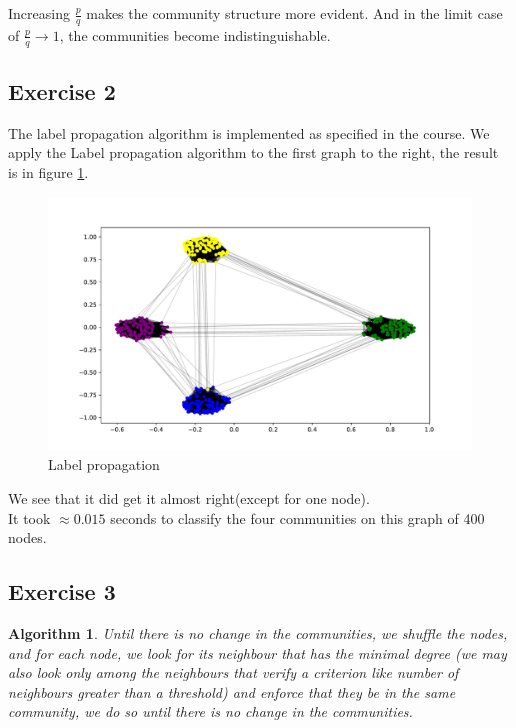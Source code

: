 \documentclass{article}
\newtheorem{algorithm}{Algorithm}
\begin{document}
Increasing $ \frac{p}{q} $ makes the community structure more evident.
And in the limit case of $ \frac{p}{q} \to 1 $, the communities become
indistinguishable.

\subsection*{Exercise 2}
The label propagation algorithm is implemented as specified in the course.
We apply the Label propagation algorithm to the first graph to the right, the
result is in figure \ref{fig:LP}.

\begin{figure}[!ht]
    \centering
    \includegraphics[width=\linewidth]{plots/images1/LabelPropagation.pdf}
    \caption{Label propagation}
    \label{fig:LP}
\end{figure}

We see that it did get it almost right(except for one node).\\
It took $\approx 0.015$ seconds to classify the four communities on this graph of 400 nodes.

\subsection*{Exercise 3}
\begin{algorithm}
Until there is no change in the communities, we shuffle the nodes, and for each
node, we look for its neighbour that has the minimal degree (we may also look
only among the neighbours that verify a criterion like number of neighbours
greater than a threshold) and enforce that they be in the same community, we do
so until there is no change in the communities.
\end{algorithm}
\end{document}
